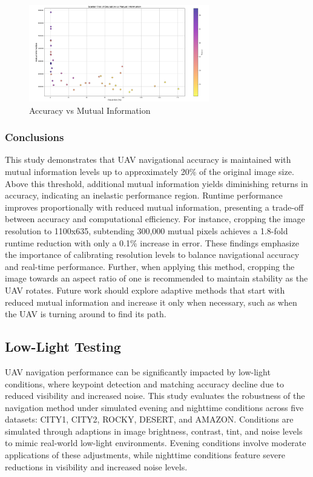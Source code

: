 \begin{figure}[H]
    \centering
    \includegraphics[width=0.7\textwidth]{Chapter 5/RESULTPLOTS/mutual/accmutual.png}
    \caption{Accuracy vs Mutual Information}
    \label{fig:Accuracy_Mutual}
\end{figure}



\subsubsection{Conclusions}

This study demonstrates that UAV navigational accuracy is maintained with mutual information levels up to approximately 20\% of the original image size. Above this threshold, additional mutual information yields diminishing returns in accuracy, indicating an inelastic performance region.
Runtime performance improves proportionally with reduced mutual information, presenting a trade-off between accuracy and computational efficiency. For instance, cropping the image resolution to 1100x635, subtending 300,000 mutual pixels achieves a 1.8-fold runtime reduction with only a 0.1\% increase in error.
These findings emphasize the importance of calibrating resolution levels to balance navigational accuracy and real-time performance. Further, when applying this method, cropping the image towards an aspect ratio of one is recommended to maintain stability as the UAV rotates. Future work should explore adaptive methods that start with reduced mutual information and increase it only when necessary, such as when the UAV is turning around to find its path. 


\subsection{Low-Light Testing}

UAV navigation performance can be significantly impacted by low-light conditions, where keypoint detection and matching accuracy decline due to reduced visibility and increased noise. This study evaluates the robustness of the navigation method under simulated evening and nighttime conditions across five datasets: CITY1, CITY2, ROCKY, DESERT, and AMAZON. Conditions are simulated through adaptions in image brightness, contrast, tint, and noise levels to mimic real-world low-light environments. Evening conditions involve moderate applications of these adjustments, while nighttime conditions feature severe reductions in visibility and increased noise levels. 

